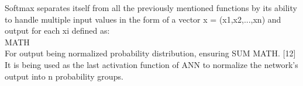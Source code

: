 
Softmax separates itself from all the previously mentioned functions by its ability to handle multiple input values in the form of a vector x = (x1,x2,...,xn) and output for each xi defined as:\\

MATH\\

For output being normalized probability distribution, ensuring SUM MATH. [12] It is being used as the last activation function of ANN to normalize the network's output into n probability groups.
